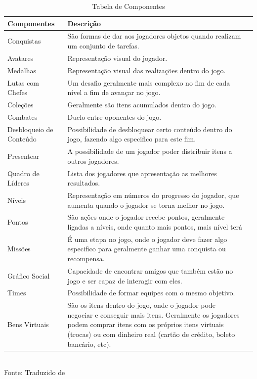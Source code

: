 \documentclass[
	12pt,				%
	openany,			%
	oneside,			%
	a4paper,			%
	english,			%
	french,				%
	spanish,			%
	brazil				%
	]{abntex2}
\begin{document}
\begin{table}[H]
\caption{Tabela de Componentes}
\begin{tabularx}{\linewidth}{|p{5cm}|X|l|} \hline
\textbf{Componentes} & \textbf{Descrição} \\ \hline

Conquistas & São formas de dar aos jogadores objetos quando realizam um conjunto de tarefas. \\ \hline
Avatares & Representação visual do jogador.\\ \hline
Medalhas & Representação visual das realizações dentro do jogo.\\ \hline

Lutas com Chefes & Um desafio geralmente mais complexo no fim de cada nível a fim de avançar no jogo.\\ \hline 
Coleções & Geralmente são itens acumulados dentro do jogo.\\ \hline 
Combates & Duelo entre oponentes do jogo.\\ \hline 
Desbloqueio de Conteúdo & Possibilidade de desbloquear certo conteúdo dentro do jogo, fazendo algo especifico para este fim.\\ \hline 
Presentear & A possibilidade de um jogador poder distribuir itens a outros jogadores.\\ \hline 
Quadro de Líderes & Lista dos jogadores que apresentação as melhores resultados.\\ \hline 
Níveis & Representação em números do progresso do jogador, que aumenta quando o jogador se torna melhor no jogo.\\ \hline 
Pontos & São ações onde o jogador recebe pontos, geralmente ligadas a níveis, onde quanto mais pontos, mais nível terá\\ \hline 
Missões & É uma etapa no jogo, onde o jogador deve fazer algo especifico para geralmente ganhar uma conquista ou recompensa.\\ \hline 
Gráfico Social & Capacidade de encontrar amigos que também estão no jogo e ser capaz de interagir com eles.\\ \hline 
Times & Possibilidade de formar equipes com o mesmo objetivo.\\ \hline 
Bens Virtuais & São os itens dentro do jogo, onde o jogador pode negociar e conseguir mais itens. Geralmente os jogadores podem comprar itens com os próprios itens virtuais (trocas) ou com dinheiro real (cartão de crédito, boleto bancário, etc).\\ \hline 


\end{tabularx}
\\

Fonte: Traduzido de 
\label{Tab:larguracolunas}
\end{table}
\end{document}
